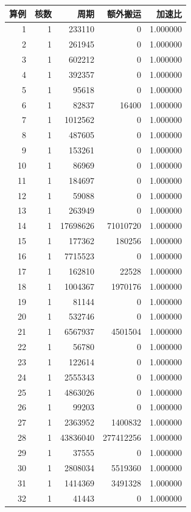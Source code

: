 \begingroup\small\setlength{\tabcolsep}{3pt}
\begin{longtable}{rrrrr}
\toprule
算例 & 核数 & 周期 & 额外搬运 & 加速比\\\midrule\endhead
1 & 1 & 233110 & 0 & 1.000000\\
2 & 1 & 261945 & 0 & 1.000000\\
3 & 1 & 602212 & 0 & 1.000000\\
4 & 1 & 392357 & 0 & 1.000000\\
5 & 1 & 95618 & 0 & 1.000000\\
6 & 1 & 82837 & 16400 & 1.000000\\
7 & 1 & 1012562 & 0 & 1.000000\\
8 & 1 & 487605 & 0 & 1.000000\\
9 & 1 & 153261 & 0 & 1.000000\\
10 & 1 & 86969 & 0 & 1.000000\\
11 & 1 & 184697 & 0 & 1.000000\\
12 & 1 & 59088 & 0 & 1.000000\\
13 & 1 & 263949 & 0 & 1.000000\\
14 & 1 & 17698626 & 71010720 & 1.000000\\
15 & 1 & 177362 & 180256 & 1.000000\\
16 & 1 & 7715523 & 0 & 1.000000\\
17 & 1 & 162810 & 22528 & 1.000000\\
18 & 1 & 1004367 & 1970176 & 1.000000\\
19 & 1 & 81144 & 0 & 1.000000\\
20 & 1 & 532746 & 0 & 1.000000\\
21 & 1 & 6567937 & 4501504 & 1.000000\\
22 & 1 & 56780 & 0 & 1.000000\\
23 & 1 & 122614 & 0 & 1.000000\\
24 & 1 & 2555343 & 0 & 1.000000\\
25 & 1 & 4863026 & 0 & 1.000000\\
26 & 1 & 99203 & 0 & 1.000000\\
27 & 1 & 2363952 & 1400832 & 1.000000\\
28 & 1 & 43836040 & 277412256 & 1.000000\\
29 & 1 & 37555 & 0 & 1.000000\\
30 & 1 & 2808034 & 5519360 & 1.000000\\
31 & 1 & 1414369 & 3491328 & 1.000000\\
32 & 1 & 41443 & 0 & 1.000000\\

\end{longtable}
